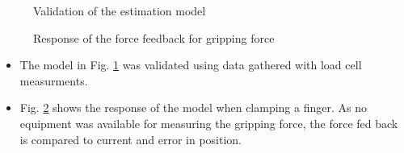 \begin{minipage}{0.5\linewidth}
\begin{figure}[H]
\centering
\resizebox{0.8\textwidth}{!}{
}
\caption{Validation of the estimation model}
\label{fig:validation}
\end{figure}

\end{minipage}
\begin{minipage}{0.5\linewidth}
\begin{figure}[H]
\centering
\resizebox{0.8\textwidth}{!}{
}
\caption{Response of the force feedback for gripping force}
\label{fig:feedback_meas}
\end{figure}
\end{minipage}

\begin{minipage}{0.5\linewidth}

\begin{center}
	\label{tab:UDPMeasurements}
\end{center}
\end{minipage}

\begin{itemize}
\item The model in Fig. \ref{fig:validation} was validated using data gathered with load cell measurments.
\item Fig. \ref{fig:feedback_meas} shows the response of the model when clamping a finger. As no equipment was available for measuring the gripping force, the force fed back is compared to current and error in position.
\end{itemize}